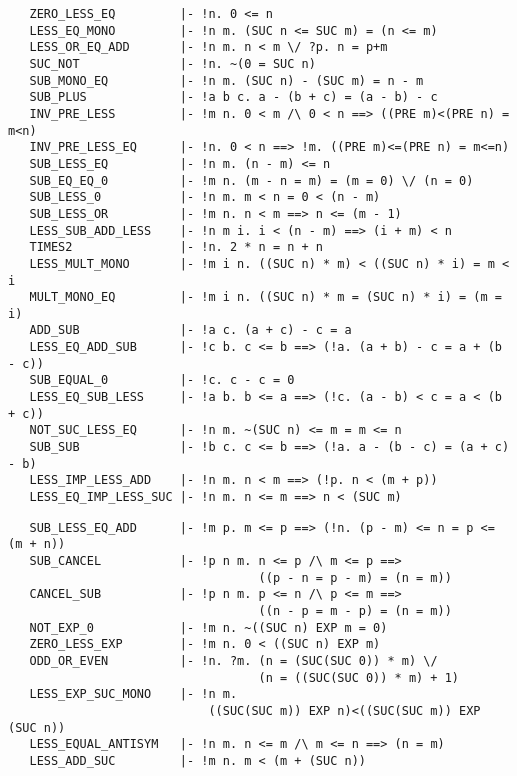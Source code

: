\begin{hol}\begin{verbatim}
   ZERO_LESS_EQ         |- !n. 0 <= n
   LESS_EQ_MONO         |- !n m. (SUC n <= SUC m) = (n <= m)
   LESS_OR_EQ_ADD       |- !n m. n < m \/ ?p. n = p+m
   SUC_NOT              |- !n. ~(0 = SUC n)
   SUB_MONO_EQ          |- !n m. (SUC n) - (SUC m) = n - m
   SUB_PLUS             |- !a b c. a - (b + c) = (a - b) - c
   INV_PRE_LESS         |- !m n. 0 < m /\ 0 < n ==> ((PRE m)<(PRE n) = m<n)
   INV_PRE_LESS_EQ      |- !n. 0 < n ==> !m. ((PRE m)<=(PRE n) = m<=n)
   SUB_LESS_EQ          |- !n m. (n - m) <= n
   SUB_EQ_EQ_0          |- !m n. (m - n = m) = (m = 0) \/ (n = 0)
   SUB_LESS_0           |- !n m. m < n = 0 < (n - m)
   SUB_LESS_OR          |- !m n. n < m ==> n <= (m - 1)
   LESS_SUB_ADD_LESS    |- !n m i. i < (n - m) ==> (i + m) < n
   TIMES2               |- !n. 2 * n = n + n
   LESS_MULT_MONO       |- !m i n. ((SUC n) * m) < ((SUC n) * i) = m < i
   MULT_MONO_EQ         |- !m i n. ((SUC n) * m = (SUC n) * i) = (m = i)
   ADD_SUB              |- !a c. (a + c) - c = a
   LESS_EQ_ADD_SUB      |- !c b. c <= b ==> (!a. (a + b) - c = a + (b - c))
   SUB_EQUAL_0          |- !c. c - c = 0
   LESS_EQ_SUB_LESS     |- !a b. b <= a ==> (!c. (a - b) < c = a < (b + c))
   NOT_SUC_LESS_EQ      |- !n m. ~(SUC n) <= m = m <= n
   SUB_SUB              |- !b c. c <= b ==> (!a. a - (b - c) = (a + c) - b)
   LESS_IMP_LESS_ADD    |- !n m. n < m ==> (!p. n < (m + p))
   LESS_EQ_IMP_LESS_SUC |- !n m. n <= m ==> n < (SUC m)
\end{verbatim}\end{hol}
\begin{hol}\begin{verbatim}
   SUB_LESS_EQ_ADD      |- !m p. m <= p ==> (!n. (p - m) <= n = p <= (m + n))
   SUB_CANCEL           |- !p n m. n <= p /\ m <= p ==> 
                                   ((p - n = p - m) = (n = m))
   CANCEL_SUB           |- !p n m. p <= n /\ p <= m ==> 
                                   ((n - p = m - p) = (n = m))
   NOT_EXP_0            |- !m n. ~((SUC n) EXP m = 0)
   ZERO_LESS_EXP        |- !m n. 0 < ((SUC n) EXP m)
   ODD_OR_EVEN          |- !n. ?m. (n = (SUC(SUC 0)) * m) \/ 
                                   (n = ((SUC(SUC 0)) * m) + 1)
   LESS_EXP_SUC_MONO    |- !n m.
                            ((SUC(SUC m)) EXP n)<((SUC(SUC m)) EXP (SUC n))
   LESS_EQUAL_ANTISYM   |- !n m. n <= m /\ m <= n ==> (n = m)
   LESS_ADD_SUC         |- !m n. m < (m + (SUC n))

\end{verbatim}\end{hol}


